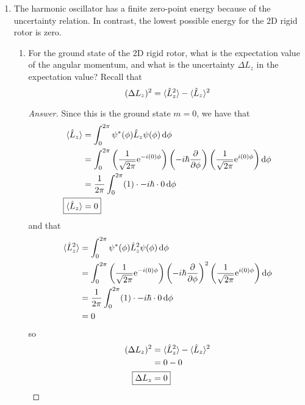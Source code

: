 \documentclass[../psets.tex]{subfiles}
\begin{document}
\begin{enumerate}
\begin{enumerate}
    \end{enumerate}
    \item The harmonic oscillator has a finite zero-point energy because of the uncertainty relation. In contrast, the lowest possible energy for the 2D rigid rotor is zero.
    \begin{enumerate}
        \item For the ground state of the 2D rigid rotor, what is the expectation value of the angular momentum, and what is the uncertainty $\Delta L_z$ in the expectation value? Recall that
        \begin{equation*}
            (\Delta L_z)^2 = \prb{\hat{L}_z^2}-\prb{\hat{L}_z}^2
        \end{equation*}
        \begin{proof}[Answer]
            Since this is the ground state $m=0$, we have that
            \begin{align*}
                \prb{\hat{L}_z} &= \int_0^{2\pi}\psi^*(\phi)\hat{L}_z\psi(\phi)\dd{\phi}\\
                &= \int_0^{2\pi}\left( \frac{1}{\sqrt{2\pi}}\e[-i(0)\phi] \right)\left( -i\hbar\pdv{\phi} \right)\left( \frac{1}{\sqrt{2\pi}}\e[i(0)\phi] \right)\dd{\phi}\\
                &= \frac{1}{2\pi}\int_0^{2\pi}(1)\cdot -i\hbar \cdot 0\dd{\phi}\\
                \Aboxed{\prb{\hat{L}_z} &= 0}
            \end{align*}
            and that
            \begin{align*}
                \prb{\hat{L}_z^2} &= \int_0^{2\pi}\psi^*(\phi)\hat{L}_z^2\psi(\phi)\dd{\phi}\\
                &= \int_0^{2\pi}\left( \frac{1}{\sqrt{2\pi}}\e[-i(0)\phi] \right)\left( -i\hbar\pdv{\phi} \right)^2\left( \frac{1}{\sqrt{2\pi}}\e[i(0)\phi] \right)\dd{\phi}\\
                &= \frac{1}{2\pi}\int_0^{2\pi}(1)\cdot -i\hbar \cdot 0\dd{\phi}\\
                &= 0
            \end{align*}
            so
            \begin{align*}
                (\Delta L_z)^2 &= \prb{\hat{L}_z^2}-\prb{\hat{L}_z}^2\\
                &= 0-0\\
                \Aboxed{\Delta L_z &= 0}
            \end{align*}
        \end{proof}

\end{enumerate}
\end{enumerate}
\end{document}
